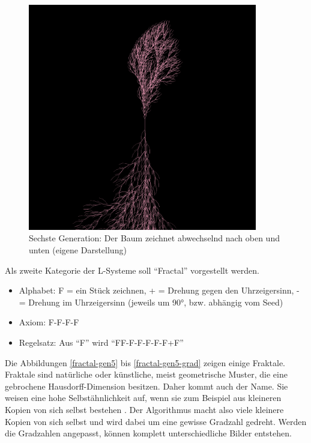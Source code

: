 \documentclass[../mciAusarbeitung.tex]{subfiles}
\begin{document}
\begin{figure}[H]
\includegraphics[width=10cm]{img/gespiegelter_baum_gen6.png}
\caption{Sechste Generation: Der Baum zeichnet abwechselnd nach oben und unten (eigene Darstellung)}
\label{gespiegelter_baum_gen6}
\end{figure}

Als zweite Kategorie der L-Systeme soll "`Fractal"' vorgestellt werden. 
\begin{itemize}
\item Alphabet: F = ein Stück zeichnen, + = Drehung gegen den Uhrzeigersinn, - = Drehung im Uhrzeigersinn (jeweils um 90°, bzw. abhängig vom Seed)
\item Axiom: F-F-F-F
\item Regelsatz: Aus "`F"' wird "`FF-F-F-F-F-F+F"'
\end{itemize}
Die Abbildungen \ref{fractal-gen5} bis \ref{fractal-gen5-grad} zeigen einige Fraktale. Fraktale sind natürliche oder künstliche, meist geometrische Muster, die eine gebrochene Hausdorff-Dimension besitzen. Daher kommt auch der Name. Sie weisen eine hohe Selbstähnlichkeit auf, wenn sie zum Beispiel aus kleineren Kopien von sich selbst bestehen \cite{mandelbrot1983fractal}. Der Algorithmus macht also viele kleinere Kopien von sich selbst und wird dabei um eine gewisse Gradzahl gedreht. Werden die Gradzahlen angepasst, können komplett unterschiedliche Bilder entstehen.
\end{document}
